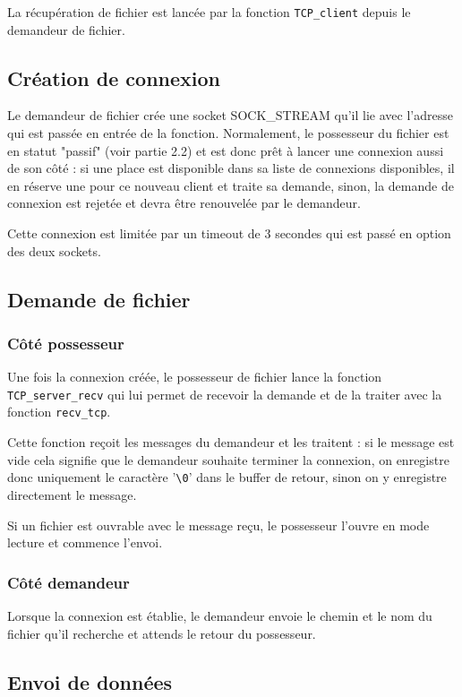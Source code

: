 La récupération de fichier est lancée par la fonction \verb|TCP_client| depuis le demandeur de fichier.

\subsection{Création de connexion}
Le demandeur de fichier crée une socket SOCK\_STREAM qu'il lie avec l'adresse qui est passée en entrée de la fonction. Normalement, le possesseur du fichier est en statut "passif" (voir partie 2.2) et est donc prêt à lancer une connexion aussi de son côté : si une place est disponible dans sa liste de connexions disponibles, il en réserve une pour ce nouveau client et traite sa demande, sinon, la demande de connexion est rejetée et devra être renouvelée par le demandeur.
\vskip 0.25cm

Cette connexion est limitée par un timeout de 3 secondes qui est passé en option des deux sockets.


\subsection{Demande de fichier}
\subsubsection{Côté possesseur}
Une fois la connexion créée, le possesseur de fichier lance la fonction \verb|TCP_server_recv| qui lui permet de recevoir la demande et de la traiter avec la fonction \verb|recv_tcp|.
\vskip 0.25cm

Cette fonction reçoit les messages du demandeur et les traitent : si le message est vide cela signifie que le demandeur souhaite terminer la connexion, on enregistre donc uniquement le caractère '\verb|\0|' dans le buffer de retour, sinon on y enregistre directement le message.\\
\vskip 0.25cm

Si un fichier est ouvrable avec le message reçu, le possesseur l'ouvre en mode lecture et commence l'envoi.
\subsubsection{Côté demandeur}

Lorsque la connexion est établie, le demandeur envoie le chemin et le nom du fichier qu'il recherche et attends le retour du possesseur.

\subsection{Envoi de données}
